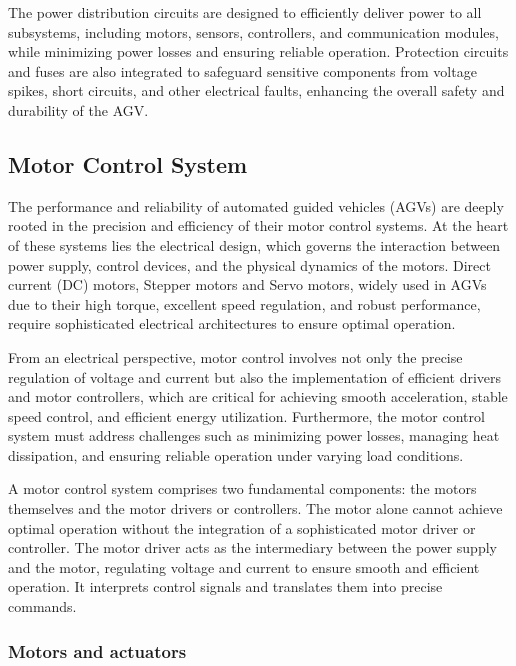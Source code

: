 \documentclass[../../main]{subfiles}
\begin{document}
The power distribution circuits are designed to efficiently deliver power to all 
subsystems, including motors, sensors, controllers, and communication 
modules, while minimizing power losses and ensuring reliable operation. 
Protection circuits and fuses are also integrated to safeguard sensitive 
components from voltage spikes, short circuits, and other electrical faults, 
enhancing the overall safety and durability of the AGV.

\subsection{Motor Control System}

The performance and reliability of automated guided vehicles (AGVs) are deeply rooted in the precision and efficiency of
their motor control systems\cite{cservenak2018further}. At the heart of these systems lies the electrical design, which governs the interaction 
between power supply, control devices, and the physical dynamics of the motors. Direct current (DC) motors\cite{OrientalMotorAGV}, Stepper motors\cite{LinEngineering_AGV} and Servo motors\cite{AMC_AGV_Benefits}, widely 
used in AGVs due to their high torque, excellent speed regulation, and robust performance, require sophisticated electrical 
architectures to ensure optimal operation. 

From an electrical perspective, motor control involves not only the precise regulation of voltage and current but 
also the implementation of efficient drivers and motor controllers, which are critical for achieving smooth acceleration, 
stable speed control, and efficient energy utilization. Furthermore, the motor control system must address challenges 
such as minimizing power losses, managing heat dissipation, and ensuring reliable operation under varying load conditions. 

A motor control system comprises two fundamental components: the motors themselves and the motor drivers or controllers. 
The motor alone cannot achieve optimal operation without the integration of a sophisticated motor driver or controller. 
The motor driver acts as the intermediary between the power supply and the motor, regulating voltage and current to ensure 
smooth and efficient operation. It interprets control signals and translates them into precise commands.

\subsubsection{Motors and actuators}
\end{document}
